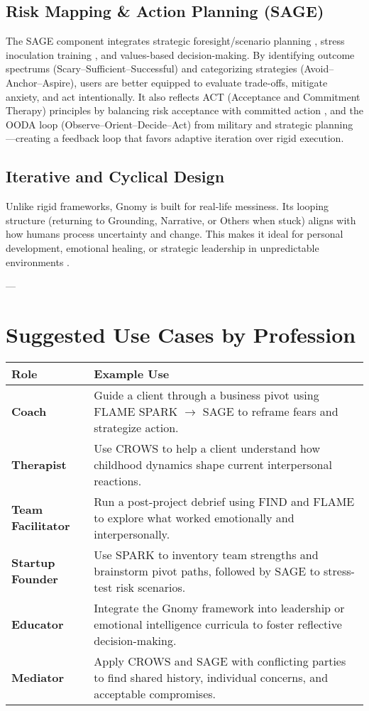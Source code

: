 \documentclass{article}
\begin{document}
\subsection{Risk Mapping \& Action Planning (SAGE)}
The SAGE component integrates strategic foresight/scenario planning \cite{schoemaker1995scenario}, stress inoculation training \cite{meichenbaum1985stress}, and values-based decision-making. By identifying outcome spectrums (Scary–Sufficient–Successful) and categorizing strategies (Avoid–Anchor–Aspire), users are better equipped to evaluate trade-offs, mitigate anxiety, and act intentionally. It also reflects ACT (Acceptance and Commitment Therapy) principles by balancing risk acceptance with committed action \cite{hayes1999acceptance}, and the OODA loop (Observe–Orient–Decide–Act) from military and strategic planning \cite{boyd1986destruction}—creating a feedback loop that favors adaptive iteration over rigid execution.

\subsection{Iterative and Cyclical Design}
Unlike rigid frameworks, Gnomy is built for real-life messiness. Its looping structure (returning to Grounding, Narrative, or Others when stuck) aligns with how humans process uncertainty and change. This makes it ideal for personal development, emotional healing, or strategic leadership in unpredictable environments \cite{kolb1984experiential}.

---

\section{Suggested Use Cases by Profession}
\begin{tabular}{|p{}|p{}|}
    \hline
    \textbf{Role} & \textbf{Example Use} \\
    \hline
    \textbf{Coach} & Guide a client through a business pivot using FLAME SPARK $\rightarrow$ SAGE to reframe fears and strategize action. \\
    \textbf{Therapist} & Use CROWS to help a client understand how childhood dynamics shape current interpersonal reactions. \\
    \textbf{Team Facilitator} & Run a post-project debrief using FIND and FLAME to explore what worked emotionally and interpersonally. \\
    \textbf{Startup Founder} & Use SPARK to inventory team strengths and brainstorm pivot paths, followed by SAGE to stress-test risk scenarios. \\
    \textbf{Educator} & Integrate the Gnomy framework into leadership or emotional intelligence curricula to foster reflective decision-making. \\
    \textbf{Mediator} & Apply CROWS and SAGE with conflicting parties to find shared history, individual concerns, and acceptable compromises. \\
    \hline
\end{tabular}
\end{document}
